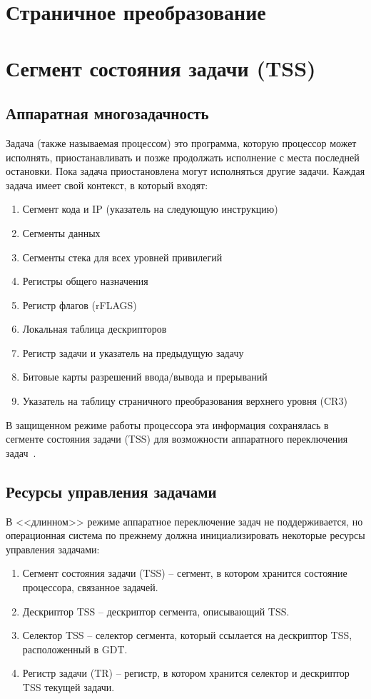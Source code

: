 \section{Страничное преобразование}

\section{Сегмент состояния задачи (TSS)}
\subsection{Аппаратная многозадачность}
Задача (также называемая процессом) это программа, которую процессор может
исполнять, приостанавливать и позже продолжать исполнение с места последней
остановки. Пока задача приостановлена могут исполняться другие задачи. Каждая
задача имеет свой контекст, в который входят:
\begin{enumerate}
\item Сегмент кода и IP (указатель на следующую инструкцию)
\item Сегменты данных
\item Сегменты стека для всех уровней привилегий
\item Регистры общего назначения
\item Регистр флагов (rFLAGS)
\item Локальная таблица дескрипторов
\item Регистр задачи и указатель на предыдущую задачу
\item Битовые карты разрешений ввода/вывода и прерываний
\item Указатель на таблицу страничного преобразования верхнего уровня (CR3)
\end{enumerate}

В защищенном режиме работы процессора эта информация сохранялась в
сегменте состояния задачи (TSS) для возможности аппаратного переключения
задач~\cite[стр. 327]{amd_pm_v2}.

\subsection{Ресурсы управления задачами}
В <<длинном>> режиме аппаратное переключение задач не поддерживается, но
операционная система по прежнему должна инициализировать некоторые ресурсы
управления задачами:
\begin{enumerate}
\item Сегмент состояния задачи (TSS) -- сегмент, в котором хранится состояние
	процессора, связанное задачей.
\item Дескриптор TSS -- дескриптор сегмента, описывающий TSS.
\item Селектор TSS -- селектор сегмента, который ссылается на дескриптор TSS,
	расположенный в GDT.
\item Регистр задачи (TR) -- регистр, в котором хранится селектор и дескриптор
	TSS текущей задачи.
\end{enumerate}

